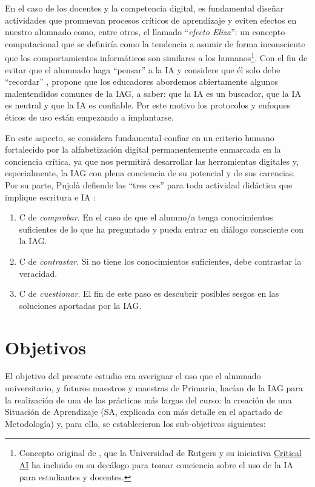 \documentclass[spanish]{textolivre}
\begin{document}
En el caso de los docentes y la competencia digital, es fundamental diseñar actividades que promuevan procesos críticos de aprendizaje y eviten efectos en nuestro alumnado como, entre otros, el llamado “\textit{efecto Eliza}”: un concepto computacional que se definiría como la tendencia a asumir de forma inconsciente que los comportamientos informáticos son similares a los humanos\footnote{Concepto original de \textcite{Hofstadter1995}, que la Universidad de Rutgers y su iniciativa \href{https://criticalai.org/}{Critical AI} ha incluido en su decálogo para tomar conciencia sobre el uso de la IA para estudiantes y docentes.}. Con el fin de evitar que el alumnado haga “pensar” a la IA y considere que él solo debe “recordar” \cite{HolmesEtAl2022}, \textcite{Ferrarelli2024} propone que los educadores abordemos abiertamente algunos malentendidos comunes de la IAG, a saber: que la IA es un buscador, que la IA es neutral y que la IA es confiable. Por este motivo los protocolos y enfoques éticos de uso están empezando a implantarse.

En este aspecto, se considera fundamental confiar en un criterio humano fortalecido por la alfabetización digital permanentemente enmarcada en la conciencia crítica, ya que nos permitirá desarrollar las herramientas digitales y, especialmente, la IAG con plena conciencia de su potencial y de sus carencias. Por su parte, Pujolà defiende las “tres ces” para toda actividad didáctica que implique escritura e IA \cite{CuestaGarciaGonzalezArguelloPujola2024}:

\begin{enumerate}
    \item C de \textit{comprobar}. En el caso de que el alumno/a tenga conocimientos suficientes de lo que ha preguntado y pueda entrar en diálogo consciente con la IAG.
    \item C de \textit{contrastar}. Si no tiene los conocimientos suficientes, debe contrastar la veracidad.
    \item C de \textit{cuestionar}. El fin de este paso es descubrir posibles sesgos en las soluciones aportadas por la IAG.
\end{enumerate}


\section{Objetivos}\label{sec-fmt-manuscrito}
El objetivo del presente estudio era averiguar el uso que el alumnado universitario, y futuros maestros y maestras de Primaria, hacían de la IAG para la realización de una de las prácticas más largas del curso: la creación de una Situación de Aprendizaje (SA, explicada con más detalle en el apartado de Metodología) y, para ello, se establecieron los sub-objetivos siguientes:
\end{document}

